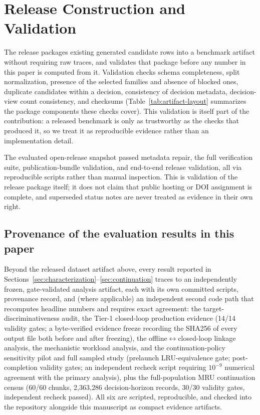 \section{Release Construction and Validation}
\label{sec:release-validation}

The release packages existing generated candidate rows into a benchmark
artifact without requiring raw traces, and validates that package before
any number in this paper is computed from it. Validation checks schema
completeness, split normalization, presence of the selected families and
absence of blocked ones, duplicate candidates within a decision,
consistency of decision metadata, decision-view count consistency, and
checksums (Table~\ref{tab:artifact-layout} summarizes the package
components these checks cover). This validation is itself part of the
contribution: a released benchmark is only as trustworthy as the checks
that produced it, so we treat it as reproducible evidence rather than an
implementation detail.

\begin{sloppypar}
The evaluated open-release snapshot passed metadata repair, the full
verification suite, publication-bundle validation, and end-to-end release
validation, all via reproducible scripts rather than manual inspection.
This is validation of the release package itself; it does not claim that
public hosting or DOI assignment is complete, and superseded status notes
are never treated as evidence in their own right.
\end{sloppypar}



\subsection{Provenance of the evaluation results in this paper}

Beyond the released dataset artifact above, every result reported in
Sections~\ref{sec:characterization}--\ref{sec:continuation} traces to an
independently frozen, gate-validated analysis artifact, each with its own
committed scripts, provenance record, and (where applicable) an
independent second code path that recomputes headline numbers and
requires exact agreement: the target-discriminativeness audit, the Tier-1
closed-loop production evidence (14/14 validity gates; a byte-verified
evidence freeze recording the SHA256 of every output file both before and
after freezing), the offline$\leftrightarrow$closed-loop linkage analysis,
the mechanistic workload analysis, and the continuation-policy sensitivity
pilot and full sampled study (prelaunch LRU-equivalence gate;
post-completion validity gates; an independent recheck script requiring
$10^{-9}$ numerical agreement with the primary analysis), plus the
full-population MRU continuation census (60/60 chunks, 2{,}363{,}286
decision-horizon records, 30/30 validity gates, independent recheck
passed). All six are scripted, reproducible, and checked into the
repository alongside this manuscript as compact evidence artifacts.

